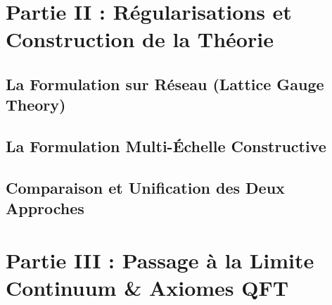 \documentclass[12pt,a4paper]{book}
\theoremstyle{remark}
\theoremstyle{definition}
\theoremstyle{plain}
\begin{document}
	\part*{Partie II : Régularisations et Construction de la Théorie}
	
	\chapter{La Formulation sur Réseau (Lattice Gauge Theory)}
	\label{chap:4}
	
	
	\chapter{La Formulation Multi-Échelle Constructive}
	\label{chap:5}
	
	
	\chapter{Comparaison et Unification des Deux Approches}
	\label{chap:6}
	
	
	\part*{Partie III : Passage à la Limite Continuum \& Axiomes QFT}
	
\end{document}
